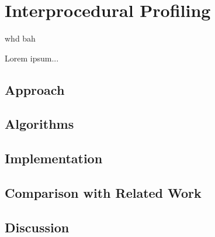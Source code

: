 \section{Interprocedural Profiling}

\ifx\ktm\undefined whd \else bah \fi

Lorem ipsum...


\subsection{Approach}

\subsection{Algorithms}

\subsection{Implementation}

\subsection{Comparison with Related Work}

\subsection{Discussion}
